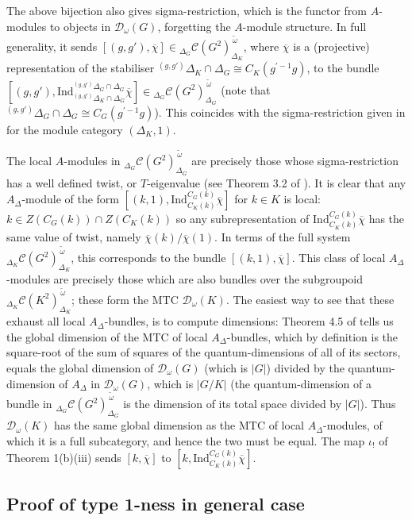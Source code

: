 \documentclass[12pt]{article}
\numberwithin{equation}{section}
\def\cC            {{\mathcal{C}}}
\def\cD            {{\mathcal{D}}}
\begin{document}
The above bijection also gives sigma-restriction, which is the functor from $A$-modules to objects in $\cD_\omega(G)$, forgetting the $A$-module structure. In full generality, it sends $[(g,g'),\overline{\chi}]\in{}_{\Delta_G}\cC(G^2)^{\,\tilde{\omega}}_{
\Delta_K}$, where $\overline{\chi}$ is a (projective) representation of the stabiliser ${}^{(g,g')}\Delta_K\cap\Delta_G\cong C_K(g^{\prime-1}g)$, to the bundle $[(g,g'),\mathrm{Ind}_{ {}^{(g,g')}\Delta_K\cap\Delta_G}^{{}^{(g,g')}\Delta_G\cap\Delta_G}\overline{\chi}]\in{}_{\Delta_G}\cC(G^2)^{\,\tilde{\omega}}_{
\Delta_G}$ (note that ${}^{(g,g')}\Delta_G\cap\Delta_G\cong C_G(g^{\prime-1}g)$). This coincides with the sigma-restriction
given in \cite{EG3} for the module category $(\Delta_K,1)$. 


The local $A$-modules in ${}_{\Delta_G}\cC(G^2)_{\Delta_G}^{\,\tilde{\omega}}$ are precisely those whose sigma-restriction has a well defined
twist, or $T$-eigenvalue (see Theorem 3.2 of \cite{KO}). It is clear that any $A_\Delta$-module
of the form $[(k,1),\mathrm{Ind}_{C_K(k)}^{C_G(k)}\overline{\chi}]$ for $k\in K$ is local: $k\in Z(C_G(k))\cap Z(C_K(k))$ so any subrepresentation of $
\mathrm{Ind}_{C_K(k)}^{C_G(k)}\overline{\chi}$ has the same value of twist, namely $\overline{\chi}(k)/\overline{\chi}(1)$. In terms of the full system ${}_{\Delta_K}\cC(G^2)^{\,\tilde{\omega}}_{\Delta_K}$, this corresponds
to the bundle $[(k,1),\overline{\chi}]$. This class of local $A_\Delta$-modules are
precisely those which are also bundles over the subgroupoid ${}_{\Delta_K}\cC(K^2)^{\,\tilde{\omega}}_{\Delta_K}$; these form the MTC $\cD_\omega(K)$. The easiest way to see that these exhaust all local $A_\Delta$-bundles, is to compute dimensions: Theorem 4.5 of \cite{KO} tells us the global dimension of the MTC of local $A_\Delta$-bundles, which by definition is the square-root of the sum of
squares of the quantum-dimensions of all of its sectors, equals the global dimension of $\cD_\omega(G)$ (which is $|G|$) divided by the quantum-dimension of $A_\Delta$ in $\cD_\omega(G)$, which is $|G/K|$ (the quantum-dimension of a bundle in ${}_{\Delta_G}\cC(G^2)^{\,\tilde{\omega}}_{\Delta_G}$ is the dimension of its total space divided by $|G|$). Thus $\cD_\omega(K)$ has the same global dimension as the MTC of local $A_\Delta$-modules, of which it is a full subcategory, and hence the two must be equal. 
The map $\iota_!$ of Theorem 1(b)(iii) sends $[k,\overline{\chi}]$ to $[k,\mathrm{Ind}_{C_K(k)}^{C_G(k)}\overline{\chi}]$.

\subsection{Proof of type 1-ness in general case}
\end{document}
